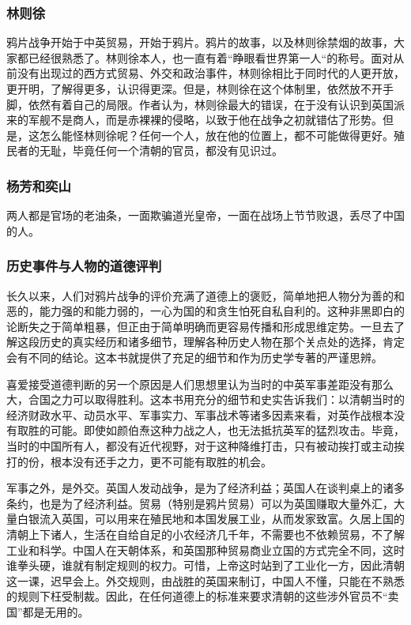 \subsubsection{林则徐}
鸦片战争开始于中英贸易，开始于鸦片。鸦片的故事，以及林则徐禁烟的故事，大家都已经很熟悉了。林则徐本人，也一直有着“睁眼看世界第一人“的称号。面对从前没有出现过的西方式贸易、外交和政治事件，林则徐相比于同时代的人更开放，更开明，了解得更多，认识得更深。但是，林则徐在这个体制里，依然放不开手脚，依然有着自己的局限。作者认为，林则徐最大的错误，在于没有认识到英国派来的军舰不是商人，而是赤裸裸的侵略，以致于他在战争之初就错估了形势。但是，这怎么能怪林则徐呢？任何一个人，放在他的位置上，都不可能做得更好。殖民者的无耻，毕竟任何一个清朝的官员，都没有见识过。

\subsubsection{杨芳和奕山}
两人都是官场的老油条，一面欺骗道光皇帝，一面在战场上节节败退，丢尽了中国的人。

\subsubsection{历史事件与人物的道德评判}
长久以来，人们对鸦片战争的评价充满了道德上的褒贬，简单地把人物分为善的和恶的，能力强的和能力弱的，一心为国的和贪生怕死自私自利的。这种非黑即白的论断失之于简单粗暴，但正由于简单明确而更容易传播和形成思维定势。一旦去了解这段历史的真实经历和诸多细节，理解各种历史人物在那个关点处的选择，肯定会有不同的结论。这本书就提供了充足的细节和作为历史学专著的严谨思辨。

喜爱接受道德判断的另一个原因是人们思想里认为当时的中英军事差距没有那么大，合国之力可以取得胜利。这本书用充分的细节和史实告诉我们：以清朝当时的经济财政水平、动员水平、军事实力、军事战术等诸多因素来看，对英作战根本没有取胜的可能。即使如颜伯焘这种力战之人，也无法抵抗英军的猛烈攻击。毕竟，当时的中国所有人，都没有近代视野，对于这种降维打击，只有被动挨打或主动挨打的份，根本没有还手之力，更不可能有取胜的机会。

军事之外，是外交。英国人发动战争，是为了经济利益；英国人在谈判桌上的诸多条约，也是为了经济利益。贸易（特别是鸦片贸易）可以为英国赚取大量外汇，大量白银流入英国，可以用来在殖民地和本国发展工业，从而发家致富。久居上国的清朝上下诸人，生活在自给自足的小农经济几千年，不需要也不依赖贸易，不了解工业和科学。中国人在天朝体系，和英国那种贸易商业立国的方式完全不同，这时谁拳头硬，谁就有制定规则的权力。可惜，上帝这时站到了工业化一方，因此清朝这一课，迟早会上。外交规则，由战胜的英国来制订，中国人不懂，只能在不熟悉的规则下枉受制裁。因此，在任何道德上的标准来要求清朝的这些涉外官员不“卖国”都是无用的。

